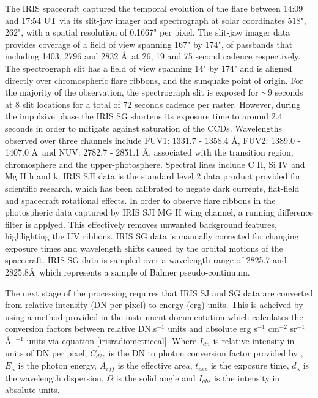 The IRIS spacecraft captured the temporal evolution of the flare between 14:09 and 17:54 UT via its slit-jaw imager and spectrograph at solar coordinates 518", 262", with a spatial resolution of 0.1667" per pixel. The slit-jaw imager data provides coverage of a field of view spanning 167" by 174", of passbands that including 1403, 2796 and 2832 \AA\ at 26, 19 and 75 second cadence respectively. The spectrograph slit has a field of view spanning 14" by 174" and is aligned directly over chromospheric flare ribbons, and the sunquake point of origin. For the majority of the observation, the spectrograph slit is exposed for $\sim9$ seconds at 8 slit locations for a total of 72 seconds cadence per raster. However, during the impulsive phase the IRIS SG shortens its exposure time to around 2.4 seconds in order to mitigate against saturation of the CCDs. Wavelengths observed over three channels include FUV1: 1331.7 - 1358.4 \AA, FUV2: 1389.0 - 1407.0 \AA\ and NUV: 2782.7 - 2851.1 \AA, associated with the transition region, chromosphere and the upper-photosphere. Spectral lines include C II, Si IV and Mg II h and k. IRIS SJI data is the standard level 2 data product provided for scientific research, which has been calibrated to negate dark currents, flat-field and spacecraft rotational effects. In order to observe flare ribbons in the photospheric data captured by IRIS SJI MG II wing channel, a running difference filter is applyed. This effectively removes unwanted background features, highlighting the UV ribbons. IRIS SG data is manually corrected for changing exposure times and wavelength shifts caused by the orbital motions of the spacecraft. IRIS SG data is sampled over a wavelength range of 2825.7 and 2825.8\AA\ which represents a sample of Balmer pseudo-continuum. 

The next stage of the processing requires that IRIS SJ and SG data are converted from relative intensity (DN per pixel) to energy (erg) units. This is acheived by using a method provided in the instrument documentation \citep{2014SoPh..289.2733D} which calculates the conversion factors between relative DN.s$^{-1}$ units and absolute erg s$^{-1}$ cm$^{-2}$ sr$^{-1}$ \AA\ $^{-1}$ units via equation \ref{irisradiometriccal}. Where $I_{dn}$ is relative intensity in units of DN per pixel, $C_{d2p}$ is the DN to photon conversion factor provided by \cite{2014SoPh..289.2733D}, $E_{\lambda}$ is the photon energy, $A_{eff}$ is the effective area, $t_{exp}$ is the exposure time, $d_{\lambda}$ is the wavelength dispersion, $\Omega$ is the solid angle and $I_{abs}$ is the intensity in absolute units.

